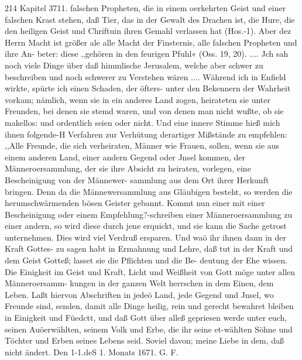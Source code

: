 214 Kapitel 3711.
falschen Propheten, die in einem oerkehrten Geist und einer
falschen Krast stehen, daß Tier, das in der Gewalt des Drachen
ist, die Hure, die den heiligen Geist und Chriftuin ihren Gemahl
verlassen hat (Hos.-1). Aber dez Herrn Macht ist größer ale
alle Macht der Finsternis, alle falschen Propheten und ihre An-
beter: diese ,,gehören in den feurigen Pfuhl« (Oss. 19, 20). ....
Jch sah noch viele Dinge über daß himmlische Jerusalem, welche
aber schwer zu beschreiben und noch schwerer zu Verstehen wären ....
Während ich in Enfield wirkte, spürte ich einen Schaden,
der öfters- unter den Bekennern der Wahrheit vorkam; nämlich,
wenn sie in ein anderes Land zogen, heirateten sie unter Freunden,
bei denen sie stemd waren, und von denen man nicht wußte, ob sie
makellos: und ordentlich seien oder nicht. Und eine innere Stimme
hieß mich ihnen folgende-H Verfahren zur Verhütung derartiger
Mißstände zu empfehlen:
,,Alle Freunde, die sich verheiraten, Männer wie Frauen,
sollen, wenn sie aus einem anderen Land, einer andern Gegend
oder Jnsel kommen, der Männeroersammlung, der sie ihre Absicht
zu heiraten, vorlegen, eine Bescheinigung von der Männewer-
sammlung aus dem Ort ihrer Herkunft bringen. Denn da die
Männewersammlung aus Gläubigen besteht, so werden die
herumschwärmenden bösen Geister gebannt. Kommt nun einer
mit einer Bescheinigung oder einem Empfehlung?-schreiben einer
Männeroersammlung zu einer andern, so wird diese durch jene
erquickt, und sie kann die Sache getrost unternehmen. Dies wird
viel Verdruß ersparen. Und waö ihr ihnen dann in der Kraft
Gottes- zu sagen habt in Ermahnung und Lehre, daß tut in der
Kraft und dem Geist Gotteß; lasset sie die Pflichten und die Be-
deutung der Ehe wissen. Die Einigkeit im Geist und Kraft,
Licht und Weißheit von Gott möge unter allen Männeroersamm-
kungen in der ganzen Welt herrschen in dem Einen, dem Leben.
Laßt hiervon Abschriften in jedeö Land, jede Gegend und
Jnsel, wo Freunde sind, senden, damit alle Dinge heilig, rein
und gerecht bewahret bleiben in Einigkeit und Füedctt, und daß
Gott über alleß gepriesen werde unter euch, seinen Auöerwählten,
seinem Volk und Erbe, die ihr seine et-wählten Söhne und Töchter
und Erben seines Lebens seid. Soviel davon; meine Liebe in
dem, daß nicht ändert.
Den 1-1.deS 1. Monats 1671. G. F.


